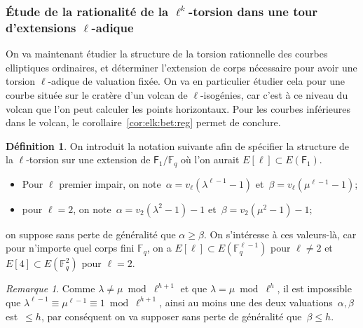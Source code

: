 \documentclass[10pt,a4paper]{book}
\theoremstyle{plain}
\theoremstyle{definition}
\theoremstyle{definition}
\theoremstyle{definition}
\theoremstyle{definition}
\theoremstyle{definition}
\newtheorem{defi}[thm]{Définition}
\theoremstyle{remark}
\newtheorem{rem}[thm]{Remarque}
\theoremstyle{remark}
\theoremstyle{definition}
\begin{document}
\subsubsection{\'Etude de la rationalité de la $\ell^k$-torsion dans une tour d'extensions $\ell$-adique}
\label{sub:classes}

On va maintenant étudier la structure de la torsion rationnelle des courbes 
elliptiques ordinaires, et déterminer l'extension de corps 
nécessaire pour avoir une torsion $\ell$-adique de valuation fixée.
On va en particulier étudier cela pour une courbe située sur le cratère
d'un volcan de $\ell$-isogénies, car c'est à ce niveau du volcan que l'on peut 
calculer les points horizontaux. Pour les courbes inférieures dans le volcan,
le corollaire~\ref{cor:elk:bet:reg} permet de conclure. 

\begin{defi}
\label{def:alp:bet}
On introduit la notation suivante afin de spécifier la structure de la 
$\ell$-torsion sur une extension de $\mathsf{F}_1 /\mathbb{F}_q$ où l'on aurait
$E[\ell] \subset E(\mathsf{F}_1)$.
\begin{itemize}
\item Pour $\ell$ premier impair, on note~$\alpha= v_{\ell}(\lambda^{\ell-1}-1)$ 
et~$\beta=v_{\ell}(\mu^{\ell-1}-1)$; 
\item pour $\ell=2$, on note~$\alpha=v_2(\lambda^2-1)-1$ et~$\beta = v_2(\mu^2-1)-1$;
\end{itemize}
on suppose sans perte de généralité que $\alpha \geqslant \beta$. On s'intéresse à ces 
valeurs-là, car pour n'importe quel corps fini $\mathbb{F}_q$, on a $E[\ell] 
\subset E(\mathbb{F}_q^{\ell-1})$ pour $\ell \neq 2$ et $E[4] \subset 
E(\mathbb{F}_q^{2})$ pour $\ell=2$. 
\end{defi}
 
\begin{rem} 
Comme $\lambda \neq \mu \bmod{\ell^{h+1}}$
et que $\lambda = \mu \bmod \ell^h$, il est impossible que $\lambda^{\ell-1} 
\equiv \mu^{\ell-1} \equiv 1 \bmod{\ell^{h+1}}$, ainsi au moins une des deux 
valuations~$\alpha, \beta$ est~$\leqslant h$, par conséquent on va supposer 
sans perte de généralité que~$\beta \leqslant h$.
\end{rem}
\end{document}
